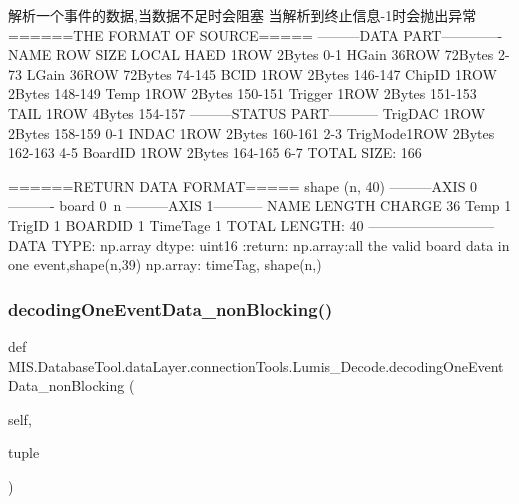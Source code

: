 \begin{DoxyVerb}解析一个事件的数据,当数据不足时会阻塞
当解析到终止信息-1时会抛出异常
======THE FORMAT OF SOURCE=====
---------DATA PART-------------
NAME    ROW     SIZE    LOCAL
HAED    1ROW    2Bytes  0-1
HGain   36ROW   72Bytes 2-73
LGain   36ROW   72Bytes 74-145
BCID    1ROW    2Bytes  146-147
ChipID  1ROW    2Bytes  148-149
Temp    1ROW    2Bytes  150-151
Trigger 1ROW    2Bytes  151-153
TAIL    1ROW    4Bytes  154-157
---------STATUS PART-----------
TrigDAC 1ROW    2Bytes  158-159 0-1
INDAC   1ROW    2Bytes  160-161 2-3
TrigMode1ROW    2Bytes  162-163 4-5
BoardID 1ROW    2Bytes  164-165 6-7
TOTAL SIZE: 166

======RETURN DATA FORMAT=====
shape   (n, 40)
---------AXIS 0----------
board   0~n
---------AXIS 1-----------
NAME            LENGTH
CHARGE          36
Temp            1
TrigID          1
BOARDID         1
TimeTage        1
TOTAL LENGTH:   40
---------------------------
DATA TYPE:  np.array
dtype:      uint16
:return: np.array:all the valid board data in one event,shape(n,39)
np.array: timeTag, shape(n,)
\end{DoxyVerb}
 \mbox{\label{classMIS_1_1DatabaseTool_1_1dataLayer_1_1connectionTools_1_1Lumis__Decode_a8a26cb0681a32eca90be17d71bc2cf64}} 
\subsubsection{\texorpdfstring{decoding\+One\+Event\+Data\+\_\+non\+Blocking()}{decodingOneEventData\_nonBlocking()}}
{\footnotesize\ttfamily def M\+I\+S.\+Database\+Tool.\+data\+Layer.\+connection\+Tools.\+Lumis\+\_\+\+Decode.\+decoding\+One\+Event\+Data\+\_\+non\+Blocking (\begin{DoxyParamCaption}\item[{}]{self,  }\item[{}]{tuple }\end{DoxyParamCaption})}

